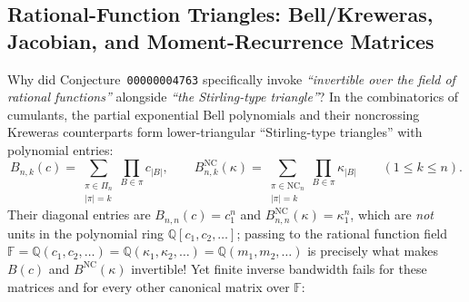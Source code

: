 \documentclass[11pt,a4paper]{article}
\theoremstyle{definition}
\theoremstyle{remark}
\newcommand{\NC}{\mathrm{NC}}
\newcommand{\Q}{\mathbb{Q}}
\begin{document}
\subsection{Rational-Function Triangles: Bell/Kreweras, Jacobian, and Moment-Recurrence Matrices}

Why did Conjecture~\texttt{00000004763} specifically invoke \emph{``invertible over the field of rational functions''} alongside \emph{``the Stirling-type triangle''}? In the combinatorics of cumulants, the partial exponential Bell polynomials and their noncrossing Kreweras counterparts form lower-triangular ``Stirling-type triangles'' with polynomial entries:
\[
  B_{n,k}(c) = \sum_{\substack{\pi \in \Pi_n \\ |\pi| = k}} \prod_{B \in \pi} c_{|B|}, \qquad
  B^{\NC}_{n,k}(\kappa) = \sum_{\substack{\pi \in \NC_n \\ |\pi| = k}} \prod_{B \in \pi} \kappa_{|B|}
  \qquad (1 \le k \le n).
\]
Their diagonal entries are $B_{n,n}(c) = c_1^n$ and $B^{\NC}_{n,n}(\kappa) = \kappa_1^n$, which are \emph{not} units in the polynomial ring $\Q[c_1,c_2,\dots]$; passing to the rational function field $\mathbb{F} = \Q(c_1,c_2,\dots) = \Q(\kappa_1,\kappa_2,\dots) = \Q(m_1,m_2,\dots)$ is precisely what makes $B(c)$ and $B^{\NC}(\kappa)$ invertible! Yet finite inverse bandwidth fails for these matrices and for every other canonical matrix over $\mathbb{F}$:
\end{document}
